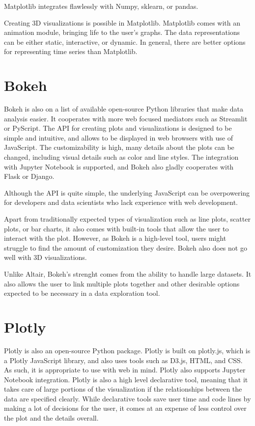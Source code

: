 Matplotlib integrates flawlessly with Numpy, sklearn, or pandas. 

Creating 3D visualizations is possible in Matplotlib. Matplotlib comes with an animation module, bringing life to the user's graphs. The data representations can be either static, interactive, or dynamic. In general, there are better options for representing time series than Matplotlib.


\section{Bokeh}
\label{sec:bokeh}
Bokeh is also on a list of available open-source Python libraries that make data analysis easier. It cooperates with more web focused mediators such as Streamlit or PyScript. The API for creating plots and visualizations is designed to be simple and intuitive, and allows to be displayed in web browsers with use of JavaScript. The customizability is high, many details about the plots can be changed, including visual details such as color and line styles. The integration with Jupyter Notebook is supported, and Bokeh also gladly cooperates with Flask or Django. 

Although the API is quite simple, the underlying JavaScript can be overpowering for developers and data scientists who lack experience with web development. 

Apart from traditionally expected types of visualization such as line plots, scatter plots, or bar charts, it also comes with built-in tools that allow the user to interact with the plot. However, as Bokeh is a high-level tool, users might struggle to find the amount of customization they desire. Bokeh also does not go well with 3D visualizations. 

Unlike Altair, Bokeh's strenght comes from the ability to handle large datasets. It also allows the user to link multiple plots together and other desirable options expected to be necessary in a data exploration tool. 

\section{Plotly}
\label{sec:plotly}
Plotly is also an open-source Python package. Plotly is built on plotly.js, which is a Plotly JavaScript library, and also uses tools such as D3.js, HTML, and CSS. As such, it is appropriate to use with web in mind. Plotly also supports Jupyter Notebook integration. Plotly is also a high level declarative tool, meaning that it takes care of large portions of the visualization if the relationships between the data are specified clearly. While declarative tools save user time and code lines by making a lot of decisions for the user, it comes at an expense of less control over the plot and the details overall. 

